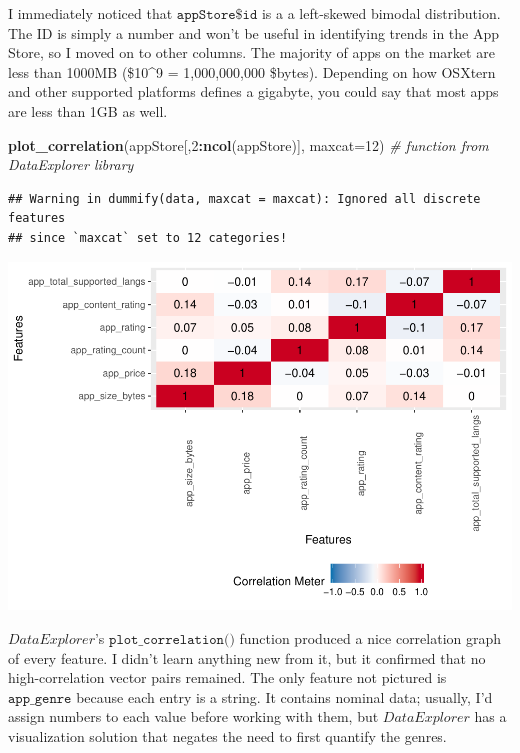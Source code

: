 \documentclass[]{article}
\newenvironment{Shaded}{\begin{snugshade}}{\end{snugshade}}
\newcommand{\CommentTok}[1]{\textcolor[rgb]{0.56,0.35,0.01}{\textit{#1}}}
\newcommand{\DataTypeTok}[1]{\textcolor[rgb]{0.13,0.29,0.53}{#1}}
\newcommand{\DecValTok}[1]{\textcolor[rgb]{0.00,0.00,0.81}{#1}}
\newcommand{\KeywordTok}[1]{\textcolor[rgb]{0.13,0.29,0.53}{\textbf{#1}}}
\newcommand{\NormalTok}[1]{#1}
\newcommand{\OperatorTok}[1]{\textcolor[rgb]{0.81,0.36,0.00}{\textbf{#1}}}
\begin{document}
I immediately noticed that \(\texttt{appStore\$id}\) is a a left-skewed
bimodal distribution. The ID is simply a number and won't be useful in
identifying trends in the App Store, so I moved on to other columns. The
majority of apps on the market are less than 1000MB (\$10\^{}9 =
1,000,000,000 \$bytes). Depending on how OSXtern and other supported
platforms defines a gigabyte, you could say that most apps are less than
1GB as well.

\begin{Shaded}
\begin{Highlighting}[]
\KeywordTok{plot_correlation}\NormalTok{(appStore[,}\DecValTok{2}\OperatorTok{:}\KeywordTok{ncol}\NormalTok{(appStore)], }\DataTypeTok{maxcat=}\DecValTok{12}\NormalTok{) }\CommentTok{# function from DataExplorer library}
\end{Highlighting}
\end{Shaded}

\begin{verbatim}
## Warning in dummify(data, maxcat = maxcat): Ignored all discrete features
## since `maxcat` set to 12 categories!
\end{verbatim}

\includegraphics{xtern_ds_report_files/figure-latex/analysis2-1.pdf}

\(\textit{DataExplorer}\)'s \(\texttt{plot\_correlation()}\) function
produced a nice correlation graph of every feature. I didn't learn
anything new from it, but it confirmed that no high-correlation vector
pairs remained. The only feature not pictured is \(\texttt{app\_genre}\)
because each entry is a string. It contains nominal data; usually, I'd
assign numbers to each value before working with them, but
\(\textit{DataExplorer}\) has a visualization solution that negates the
need to first quantify the genres.
\end{document}
